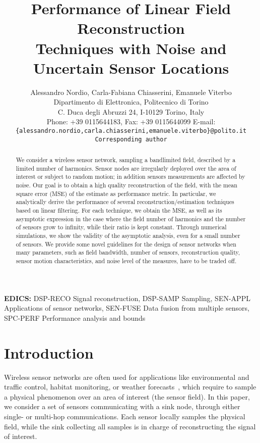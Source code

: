 \documentclass[final, a4paper]{IEEEtran}
\title{Performance of Linear Field Reconstruction\\ Techniques
with Noise and Uncertain Sensor Locations
}
\author{Alessandro Nordio, Carla-Fabiana Chiasserini, Emanuele Viterbo\\
Dipartimento di Elettronica, Politecnico di Torino\\
C. Duca degli Abruzzi 24, I-10129 Torino, Italy\\
Phone: +39 0115644183, Fax: +39 0115644099
E-mail: \tt{\{alessandro.nordio,carla.chiasserini,emanuele.viterbo\}@polito.it} \\
{\rm  Corresponding author}}
\begin{document}
\maketitle

\begin{abstract}
We consider a wireless sensor network, sampling a 
bandlimited field, described by a limited number of harmonics.
Sensor nodes are irregularly deployed over the area of
interest or subject to random motion; in addition sensors
measurements are affected by noise. Our goal is to obtain a high
quality reconstruction of the field, with the mean square error
(MSE) of the estimate as performance metric. In particular, we
analytically derive the performance of several
reconstruction/estimation techniques based on linear filtering. For
each technique, we obtain the MSE, as well as its
asymptotic expression in the case where the field
number of harmonics and the number of sensors grow
to infinity, while their ratio is kept constant.
Through numerical simulations, we show the validity of the
asymptotic analysis, even for a small number of sensors.
We provide some novel guidelines for the design of sensor networks when many parameters,
such as field bandwidth, number of sensors, reconstruction quality,
sensor motion characteristics, and noise level of the measures, have
to be traded off.
\end{abstract}

{\bf EDICS:}  DSP-RECO Signal reconstruction, DSP-SAMP Sampling,
SEN-APPL Applications of sensor networks,
SEN-FUSE Data fusion from multiple sensors,
SPC-PERF Performance analysis and bounds

\newpage
\section{Introduction}
Wireless sensor networks are often used for applications like environmental and traffic control,
habitat monitoring, or weather forecasts~\cite{Akyildiz02}, which
require to sample a physical phenomenon over an area of interest
(the sensor field).
In this paper, we consider a set of
sensors communicating with a sink node,
through either single- or multi-hop communications.
Each sensor locally samples the physical field, while the sink collecting all samples
is in charge of reconstructing the signal of interest.
\end{document}
